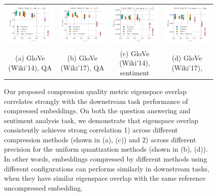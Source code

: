 \begin{figure}
	\footnotesize
	\begin{tabular}{@{\hskip -0.0in}c@{\hskip -0.0in}c@{\hskip -0.0in}c@{\hskip -0.0in}c@{\hskip -0.0in}}
		\includegraphics[width=.245\linewidth]{figures/glove400k_qa_best-f1_vs_subspace-dist-normalized_linx_det.pdf} &
		\includegraphics[width=.245\linewidth]{figures/glove-wiki400k-am_qa_best-f1_vs_subspace-dist-normalized_linx_det.pdf} &
		\includegraphics[width=.245\linewidth]{figures/glove400k_sentiment_sst_test-acc_vs_subspace-dist-normalized_linx_det.pdf} &
		\includegraphics[width=.245\linewidth]{figures/glove-wiki400k-am_sentiment_sst_test-acc_vs_subspace-dist-normalized_linx_det.pdf}	\\
		(a) GloVe (Wiki'14), QA & \;\;\;\;(b) GloVe (Wiki'17), QA  & \;\;\;\;\;\;(c) GloVe (Wiki'14), sentiment & \;\;\;\;\;(d) GloVe (Wiki'17), 
	\end{tabular}
	\caption{Our proposed compression quality metric eigenspace overlap correlates strongly with the downstream task performance of compressed embeddings.  On both the question answering and sentiment analysis task, we demonstrate that eigenspace overlap consistently achieves strong correlation 1) across different compression methods (shown in (a), (c)) and 2) across different precision for the uniform quantization methods (shown in (b), (d)). In other words, embeddings compressed by different methods using different configurations can performs similarly in downstream tasks, when they have similar eigenspace overlap with the same reference uncompressed embedding.}
	\label{fig:good_correlation_det}
\end{figure}



